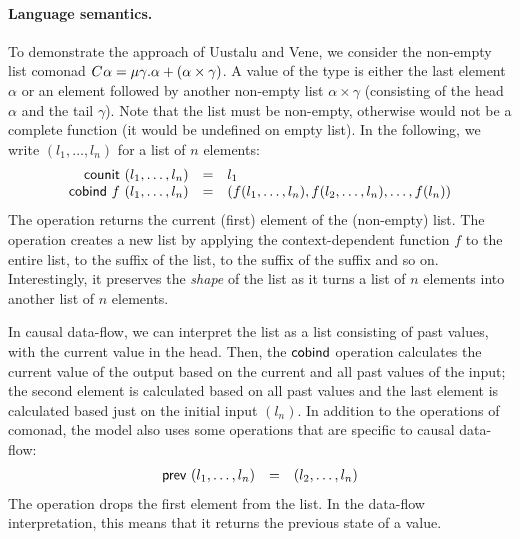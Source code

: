 \paragraph{Language semantics.}
To demonstrate the approach of Uustalu and Vene, we consider the non-empty list comonad
$C^{}\alpha = \mu \gamma.\alpha + (\alpha \times \gamma)$. A value of the type is either
the last element $\alpha$ or an element followed by another non-empty list $\alpha \times \gamma$
(consisting of the head $\alpha$ and the tail $\gamma$). Note that the list must be non-empty, 
otherwise  would not be a complete function (it would be undefined on empty list). In 
the following, we write $(l_1, \ldots, l_n)$ for a list of $n$ elements:
%
\begin{equation*}
\begin{array}{rcl}
\textnormal{\sffamily counit}~(l_1, \ldots, l_n) &=& l_1\\
\textnormal{\sffamily cobind}~f~(l_1, \ldots, l_n) &=& (f (l_1, \ldots, l_n), f (l_2, \ldots, l_n), \ldots, f (l_n))
\end{array}
\end{equation*}
%
The  operation returns the current (first) element of the (non-empty) list.
The  operation creates a new list by applying the context-dependent function $f$
to the entire list, to the suffix of the list, to the suffix of the suffix and so on. Interestingly,
it preserves the \emph{shape} of the list as it turns a list of $n$ elements into another list
of $n$ elements.

In causal data-flow, we can interpret the list as a list consisting of past values, with the 
current value in the head. Then, the $\textnormal{\sffamily cobind}$ operation calculates the current value
of the output based on the current and all past values of the input; the second element is
calculated based on all past values and the last element is calculated based just on the initial
input $(l_n)$. In addition to the operations of comonad, the model also uses some operations that
are specific to causal data-flow:
%
\begin{equation*}
\begin{array}{rcl}
\textnormal{\sffamily prev}~(l_1, \ldots, l_n) &=& (l_2, \ldots, l_n)\\
\end{array}
\end{equation*}
%
The operation drops the first element from the list. In the data-flow interpretation, this means
that it returns the previous state of a value. 

